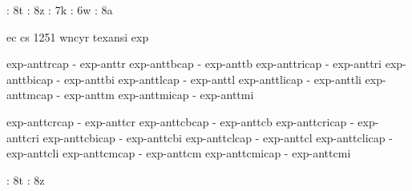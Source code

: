 \registerenc: 8t  \registerenc: 8z  \registerenc: 7k  \registerenc: 6w
\registerenc: 8a


\def\nowackienc{\csname nowacki:\fotenc\endcsname}
\expandafter \def \csname nowacki:8t\endcsname {ec}
\expandafter \def \csname nowacki:8z\endcsname {cs}
\expandafter \def \csname nowacki:6w\endcsname {1251}
\expandafter \def \csname nowacki:7k\endcsname {wncyr}
\expandafter \def \csname nowacki:8a\endcsname {texansi}
\expandafter \def \csname nowacki:8x\endcsname {exp}


\registertfm exp-anttrcap  - exp-anttr
\registertfm exp-anttbcap  - exp-anttb
\registertfm exp-anttricap - exp-anttri
\registertfm exp-anttbicap - exp-anttbi
\registertfm exp-anttlcap  - exp-anttl
\registertfm exp-anttlicap - exp-anttli
\registertfm exp-anttmcap  - exp-anttm
\registertfm exp-anttmicap - exp-anttmi

\registertfm exp-anttcrcap  - exp-anttcr
\registertfm exp-anttcbcap  - exp-anttcb
\registertfm exp-anttcricap - exp-anttcri
\registertfm exp-anttcbicap - exp-anttcbi
\registertfm exp-anttclcap  - exp-anttcl
\registertfm exp-anttclicap - exp-anttcli
\registertfm exp-anttcmcap  - exp-anttcm
\registertfm exp-anttcmicap - exp-anttcmi

\registerenc: 8t \registerenc: 8z

\endinput
